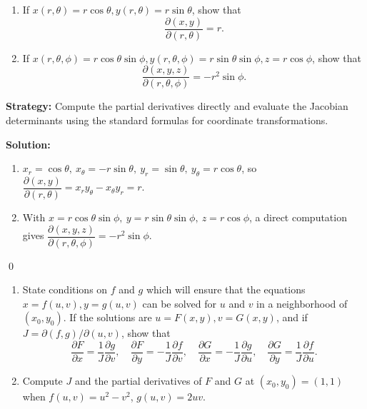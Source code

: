 \begin{problembox}
\begin{enumerate}[label=(\alph*)]
    \item If \( x(r, \theta) = r \cos \theta, y(r, \theta) = r \sin \theta \), show that
    \[\frac{\partial (x, y)}{\partial (r, \theta)} = r.\]
    \item If \( x(r, \theta, \phi) = r \cos \theta \sin \phi, y(r, \theta, \phi) = r \sin \theta \sin \phi, z = r \cos \phi \), show that
    \[\frac{\partial (x, y, z)}{\partial (r, \theta, \phi)} = -r^2 \sin \phi.\]
\end{enumerate}
\end{problembox}

\noindent\textbf{Strategy:} Compute the partial derivatives directly and evaluate the Jacobian determinants using the standard formulas for coordinate transformations.

\bigskip\noindent\textbf{Solution:}
\begin{enumerate}[label=(\alph*)]
    \item $x_r=\cos\theta,\ x_\theta=-r\sin\theta,\ y_r=\sin\theta,\ y_\theta=r\cos\theta$, so
    $\dfrac{\partial(x,y)}{\partial(r,\theta)}=x_r y_\theta-x_\theta y_r=r$.
    \item With $x=r\cos\theta\sin\phi,\ y=r\sin\theta\sin\phi,\ z=r\cos\phi$, a direct computation gives
    $\dfrac{\partial(x,y,z)}{\partial(r,\theta,\phi)}=-r^2\sin\phi$.
\end{enumerate}\qed


\begin{problembox}
\begin{enumerate}[label=(\alph*)]
    \item State conditions on \( f \) and \( g \) which will ensure that the equations \( x = f(u, v), y = g(u, v) \) can be solved for \( u \) and \( v \) in a neighborhood of \( (x_0, y_0) \). If the solutions are \( u = F(x, y), v = G(x, y) \), and if \( J = \partial (f, g)/\partial (u, v) \), show that
    \[\frac{\partial F}{\partial x} = \frac{1}{J} \frac{\partial g}{\partial v}, \quad \frac{\partial F}{\partial y} = -\frac{1}{J} \frac{\partial f}{\partial v}, \quad \frac{\partial G}{\partial x} = -\frac{1}{J} \frac{\partial g}{\partial u}, \quad \frac{\partial G}{\partial y} = \frac{1}{J} \frac{\partial f}{\partial u}.\]
    \item Compute \( J \) and the partial derivatives of \( F \) and \( G \) at \((x_0, y_0) = (1, 1)\) when \( f(u, v) = u^2 - v^2 \), \( g(u, v) = 2uv \).
\end{enumerate}
\end{problembox}


